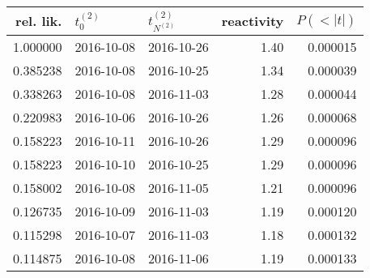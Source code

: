 \begin{tabular}{rllrr}
\toprule
 rel. lik. & $t_0^{(2)}$ & $t^{(2)}_{N^{(2)}}$ & reactivity &  $P(<|t|)$ \\
\midrule
  1.000000 &  2016-10-08 &          2016-10-26 &       1.40 &   0.000015 \\
  0.385238 &  2016-10-08 &          2016-10-25 &       1.34 &   0.000039 \\
  0.338263 &  2016-10-08 &          2016-11-03 &       1.28 &   0.000044 \\
  0.220983 &  2016-10-06 &          2016-10-26 &       1.26 &   0.000068 \\
  0.158223 &  2016-10-11 &          2016-10-26 &       1.29 &   0.000096 \\
  0.158223 &  2016-10-10 &          2016-10-25 &       1.29 &   0.000096 \\
  0.158002 &  2016-10-08 &          2016-11-05 &       1.21 &   0.000096 \\
  0.126735 &  2016-10-09 &          2016-11-03 &       1.19 &   0.000120 \\
  0.115298 &  2016-10-07 &          2016-11-03 &       1.18 &   0.000132 \\
  0.114875 &  2016-10-08 &          2016-11-06 &       1.19 &   0.000133 \\
\bottomrule
\end{tabular}
